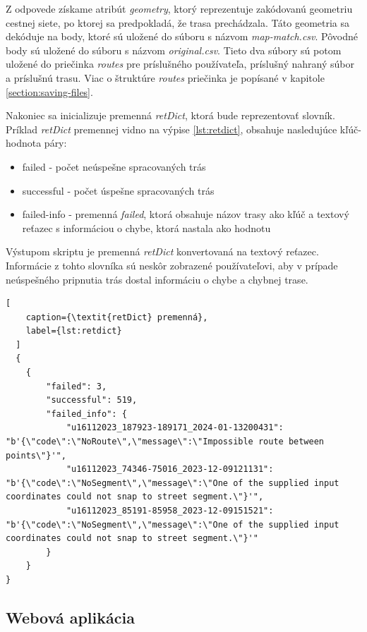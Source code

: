 Z odpovede získame atribút \textit{geometry}, ktorý reprezentuje zakódovanú geometriu cestnej siete, po ktorej sa predpokladá, že trasa prechádzala. Táto geometria sa dekóduje na body, ktoré sú uložené do súboru s názvom \textit{map-match.csv}. Pôvodné body sú uložené do súboru s názvom \textit{original.csv}. Tieto dva súbory sú potom uložené do priečinka \textit{routes} pre príslušného používateľa, príslušný nahraný súbor a príslušnú trasu. Viac o štruktúre \textit{routes} priečinka je popísané v kapitole \ref{section:saving-files}.

Nakoniec sa inicializuje premenná \textit{retDict}, ktorá bude reprezentovať slovník. Príklad \textit{retDict} premennej vidno na výpise \ref{lst:retdict}, obsahuje nasledujúce kľúč-hodnota páry:
\begin{itemize}
  \item failed -  počet neúspešne spracovaných trás
  \item successful - počet úspešne spracovaných trás
  \item failed-info - premenná \textit{failed}, ktorá obsahuje názov trasy ako kľúč a textový reťazec s informáciou o chybe, ktorá nastala ako hodnotu
\end{itemize}
Výstupom skriptu je premenná \textit{retDict} konvertovaná na textový reťazec. Informácie z tohto slovníka sú neskôr zobrazené používateľovi, aby v prípade neúspešného pripnutia trás dostal informáciu o chybe a chybnej trase.




\begin{lstlisting}[
    caption={\textit{retDict} premenná},
    label={lst:retdict}
  ]
  {
    {
        "failed": 3,
        "successful": 519,
        "failed_info": {
            "u16112023_187923-189171_2024-01-13200431": "b'{\"code\":\"NoRoute\",\"message\":\"Impossible route between points\"}'",
            "u16112023_74346-75016_2023-12-09121131": "b'{\"code\":\"NoSegment\",\"message\":\"One of the supplied input coordinates could not snap to street segment.\"}'",
            "u16112023_85191-85958_2023-12-09151521": "b'{\"code\":\"NoSegment\",\"message\":\"One of the supplied input coordinates could not snap to street segment.\"}'"
        }
    }
}
  \end{lstlisting}


\subsection{Webová aplikácia}
